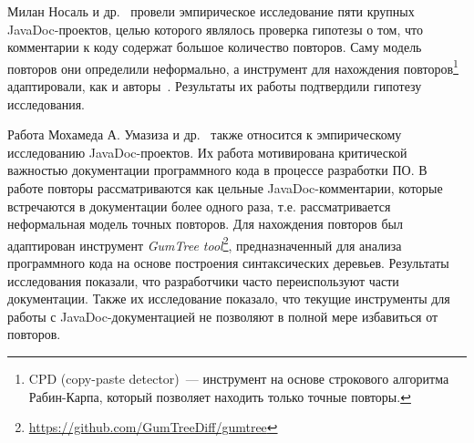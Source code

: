 Милан Носаль и др.~\cite{poruban2016preliminary} провели эмпирическое исследование пяти крупных  
JavaDoc-проектов, целью которого являлось проверка гипотезы о том, что комментарии к коду содержат большое количество повторов.
Саму модель повторов они определили неформально, а инструмент для нахождения повторов\footnote{CPD (copy-paste detector)~--- инструмент на основе строкового алгоритма Рабин-Карпа, который позволяет находить только точные повторы.} адаптировали, как и авторы~\cite{juergens2010can}.
Результаты их работы подтвердили гипотезу исследования. 


Работа Мохамеда А. Умазиза и др.~\cite{oumaziz2017documentation} также относится к эмпирическому исследованию JavaDoc-проектов. 
Их работа мотивирована критической важностью документации программного кода в процессе разработки ПО.
В работе повторы рассматриваются как цельные JavaDoc-комментарии, которые встречаются в документации более одного раза, т.е. рассматривается неформальная модель точных повторов.
Для нахождения повторов был адаптирован инструмент \emph{GumTree tool}\footnote{\url{https://github.com/GumTreeDiff/gumtree}},  предназначенный для анализа программного кода на основе построения синтаксических деревьев.
Результаты исследования показали, что  разработчики часто  переиспользуют части документации.
Также их исследование показало, что текущие инструменты для работы с JavaDoc-документацией не позволяют в полной мере избавиться от повторов.



